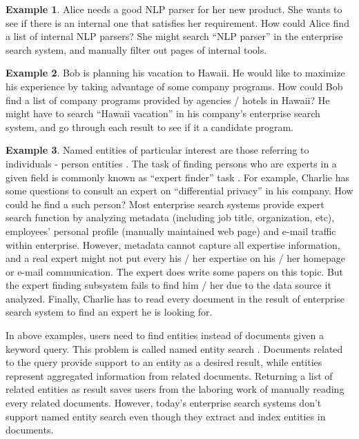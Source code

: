 \documentclass{sig-alternate}
\theoremstyle{definition}
\newtheorem{example}{Example}
\begin{document}
\begin{example}
Alice needs a good NLP parser for her new product. She wants to see if there is an internal one that satisfies her requirement. How could Alice find a list of internal NLP parsers? She might search ``NLP parser'' in the enterprise search system, and manually filter out pages of internal tools.
\end{example}

\begin{example}
Bob is planning his vacation to Hawaii. He would like to maximize his experience by taking advantage of some company programs. How could Bob find a list of company programs provided by agencies / hotels in Hawaii? He might have to search ``Hawaii vacation'' in his company's enterprise search system, and go through each result to see if it a candidate program.
\end{example}

\begin{example}
Named entities of particular interest are those referring to individuals - person entities \cite{petkova2007proximity}. The task of finding persons who are experts in a given field is commonly known as ``expert finder'' task \cite{mattox1999enterprise}. For example, Charlie has some questions to consult an expert on ``differential privacy'' in his company. How could he find a such person? Most enterprise search systems provide expert search function by analyzing metadata (including job title, organization, etc), employees' personal profile (manually maintained web page) and e-mail traffic within enterprise. However, metadata cannot capture all expertise information, and a real expert might not put every his / her expertise on his / her homepage or e-mail communication. The expert does write some papers on this topic. But the expert finding subsystem fails to find him / her due to the data source it analyzed. Finally, Charlie has to read every document in the result of enterprise search system to find an expert he is looking for.
\end{example}

In above examples, users need to find entities instead of documents given a keyword query. This problem is called named entity search \cite{cheng2007entityrank}. Documents related to the query provide support to an entity as a desired result, while entities represent aggregated information from related documents. Returning a list of related entities as result saves users from the laboring work of manually reading every related documents. However, today's enterprise search systems don't support named entity search even though they extract and index entities in documents.
\end{document}
